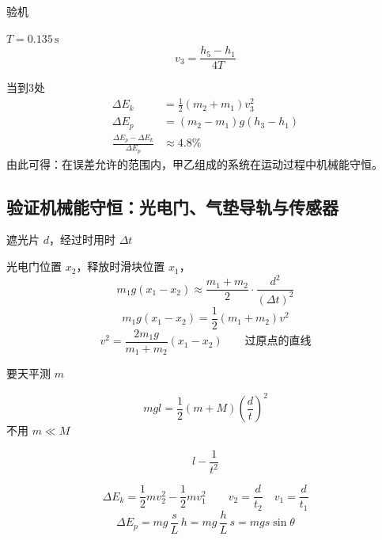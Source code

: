 \begin{problem}
验机 %



$T=0.135\,\mathrm{s}$ %
\[ v_3=\frac{h_5-h_1}{4T} \]

\begin{solution}
当到3处
\begin{align*}
\Delta E_k&=\frac12(m_2+m_1)v_3^2\\
\Delta E_p&=(m_2-m_1)g(h_3-h_1)\\
\frac{\Delta E_p-\Delta E_k}{\Delta E_p}&\approx 4.8\%
\end{align*}
由此可得：在误差允许的范围内，甲乙组成的系统在运动过程中机械能守恒。
\end{solution}
\end{problem}

\subsection{验证机械能守恒：光电门、气垫导轨与传感器}

遮光片 $d$，经过时用时 $\Delta t$ %

光电门位置 $x_2$，释放时滑块位置 $x_1$，
\[ m_1g(x_1-x_2)\approx\frac{m_1+m_2}{2}\cdot\frac{d^2}{(\Delta t)^2} \]
\[ m_1g(x_1-x_2)=\frac12(m_1+m_2)v^2 \]
\[ v^2=\frac{2m_1g}{m_1+m_2}(x_1-x_2)\qquad\text{过原点的直线} \]

要天平测 $m$


\[ mgl=\frac12(m+M)\left(\frac{d}{t}\right)^2 \]
不用 $m\ll M$

\[ l-\frac{1}{t^2} \]


\[ \Delta E_k=\frac12mv_2^2-\frac12mv_1^2\qquad v_2=\frac{d}{t_2}\quad v_1=\frac{d}{t_1} \]
\[ \Delta E_p=mg\,\frac{s}{L}\,h=mg\,\frac{h}{L}\,s=mgs\sin\theta \]

